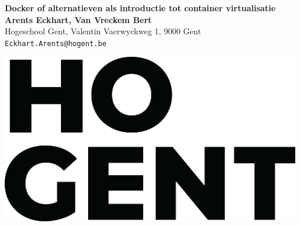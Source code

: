 \documentclass[a0,portrait]{a0poster}
\begin{document}


\begin{minipage}[t]{0.75\linewidth}
\VeryHuge \color{HoGentAccent1} \textbf{Docker of alternatieven als introductie tot container virtualisatie} \color{Black}\\ %
\huge \textbf{Arents Eckhart, Van Vreckem Bert}\\[0.5cm] %
\huge Hogeschool Gent, Valentin Vaerwyckweg 1, 9000 Gent\\[0.4cm] %
\Large \texttt{Eckhart.Arents@hogent.be} \\
\end{minipage}
%
\begin{minipage}[t]{0.25\linewidth}
\includegraphics[width=13cm,right]{figures/HOGENT_Logo_Pos_rgb.png} 

\end{minipage}

\vspace{1cm} %

\end{document}
